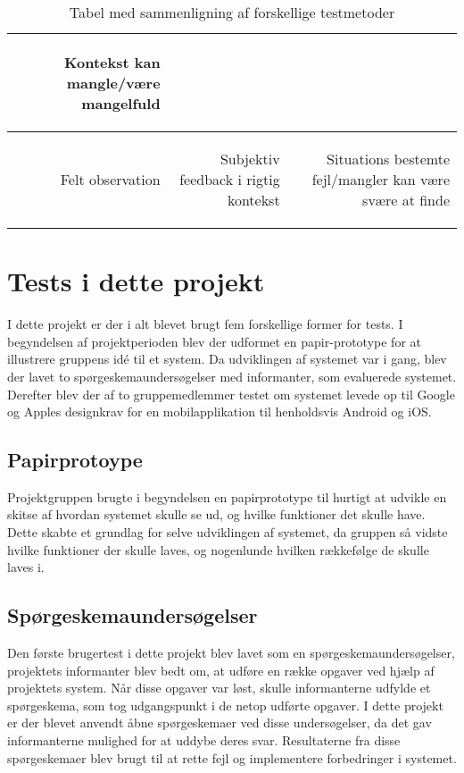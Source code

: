 \begin{table}[H]
\begin{tabularx}{\textwidth}{|R|R|R|}
\begin{noindlist}
		\item Kontekst kan mangle/være mangelfuld 
		\end{noindlist}
		\\ \hline
		Felt observation		
		&
		\begin{noindlist}
		\item Subjektiv feedback i rigtig kontekst
		\end{noindlist}
		&
		\begin{noindlist}
		\item Situations bestemte fejl/mangler kan være svære at finde
		\end{noindlist}
		\\ \hline
\end{tabularx}
	
\caption{Tabel med sammenligning af forskellige testmetoder}
\label{tab:Testsammenligning}
\end{table}

\section{Tests i dette projekt}
I dette projekt er der i alt blevet brugt fem forskellige former for tests. I begyndelsen af projektperioden blev der udformet en papir-prototype for at illustrere gruppens idé til et system. Da udviklingen af systemet var i gang, blev der lavet to spørgeskemaundersøgelser med informanter, som evaluerede systemet. Derefter blev der af to gruppemedlemmer testet om systemet levede op til Google og Apples designkrav for en mobilapplikation til henholdsvis Android og iOS.  

\subsection{Papirprotoype} %
Projektgruppen brugte i begyndelsen en papirprototype til hurtigt at udvikle en skitse af hvordan systemet skulle se ud, og hvilke funktioner det skulle have. Dette skabte et grundlag for selve udviklingen af systemet, da gruppen så vidste hvilke funktioner der skulle laves, og nogenlunde hvilken rækkefølge de skulle laves i.

\subsection{Spørgeskemaundersøgelser}
Den første brugertest i dette projekt blev lavet som en spørgeskemaundersøgelser, projektets informanter blev bedt om, at udføre en række opgaver ved hjælp af projektets system. Når disse opgaver var løst, skulle informanterne udfylde et spørgeskema, som tog udgangspunkt i de netop udførte opgaver. I dette projekt er der blevet anvendt åbne spørgeskemaer ved disse undersøgelser, da det gav informanterne mulighed for at uddybe deres svar. Resultaterne fra disse spørgeskemaer blev brugt til at rette fejl og implementere forbedringer i systemet.


